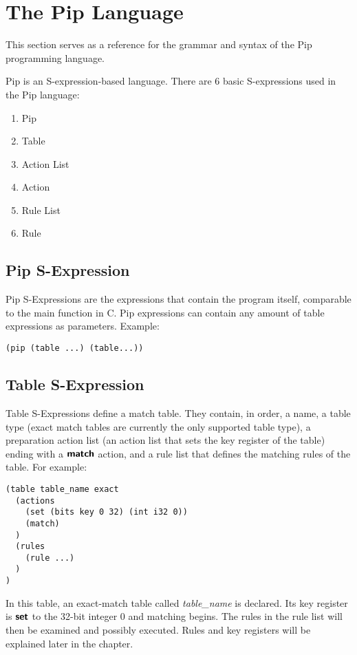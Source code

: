 \section{The Pip Language}
This section serves as a reference for the grammar and syntax of the Pip programming language.

Pip is an S-expression-based language. There are 6 basic S-expressions used in the Pip language:
\begin{enumerate}
  \item Pip
  \item Table
  \item Action List
  \item Action
  \item Rule List
  \item Rule
\end{enumerate}

\subsection{Pip S-Expression}
Pip S-Expressions are the expressions that contain the program itself, comparable to the main function in C. Pip expressions can contain any amount of table expressions as parameters. Example:
\begin{lstlisting}
(pip (table ...) (table...))
\end{lstlisting}

\subsection{Table S-Expression}
Table S-Expressions define a match table. They contain, in order, a name, a table type (exact match tables are currently the only supported table type), a preparation action list (an action list that sets the key register of the table) ending with a $\bm{\mathsf{{match}}}$ action, and a rule list that defines the matching rules of the table. For example:
\begin{lstlisting}
(table table_name exact
  (actions
    (set (bits key 0 32) (int i32 0))
    (match)
  )
  (rules
    (rule ...)
  )
)
\end{lstlisting}
In this table, an exact-match table called \textit{table\_name} is declared. Its key register is $\bm{\mathsf{{set}}}$ to the 32-bit integer 0 and matching begins. The rules in the rule list will then be examined and possibly executed. Rules and key registers will be explained later in the chapter.


